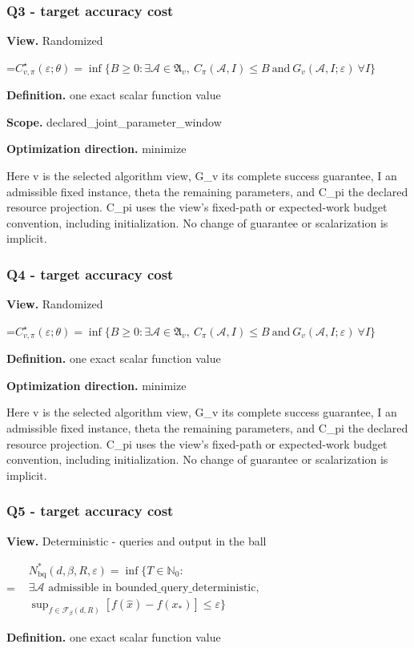 \documentclass[10pt,a4paper]{article}
\newcommand{\AtlasMath}[1]{\par\begingroup\centering\setbox0=\hbox{$\displaystyle #1$}\ifdim\wd0>1.4\linewidth\typeout{ATLAS WIDE FORMULA: \the\wd0}\fi\ifdim\wd0>\linewidth\resizebox{\linewidth}{!}{\box0}\else\box0\fi\par\endgroup}
\begin{document}
\subsubsection{Q3 - target accuracy cost}
\textbf{View.} Randomized

\AtlasMath{C^\star_{v,\pi}(\varepsilon;\theta)=\inf\{B\ge0:\exists\mathcal A\in\mathfrak A_v,\ C_\pi(\mathcal A,I)\le B\ \text{and}\ G_v(\mathcal A,I;\varepsilon)\ \forall I\}}
\textbf{Definition.} one exact scalar function value

\textbf{Scope.} declared\_joint\_parameter\_window

\textbf{Optimization direction.} minimize

Here v is the selected algorithm view, G\_v its complete success guarantee, I an admissible fixed instance, theta the remaining parameters, and C\_pi the declared resource projection. C\_pi uses the view's fixed-path or expected-work budget convention, including initialization. No change of guarantee or scalarization is implicit.

\subsubsection{Q4 - target accuracy cost}
\textbf{View.} Randomized

\AtlasMath{C^\star_{v,\pi}(\varepsilon;\theta)=\inf\{B\ge0:\exists\mathcal A\in\mathfrak A_v,\ C_\pi(\mathcal A,I)\le B\ \text{and}\ G_v(\mathcal A,I;\varepsilon)\ \forall I\}}
\textbf{Definition.} one exact scalar function value

\textbf{Optimization direction.} minimize

Here v is the selected algorithm view, G\_v its complete success guarantee, I an admissible fixed instance, theta the remaining parameters, and C\_pi the declared resource projection. C\_pi uses the view's fixed-path or expected-work budget convention, including initialization. No change of guarantee or scalarization is implicit.

\subsubsection{Q5 - target accuracy cost}
\textbf{View.} Deterministic - queries and output in the ball

\AtlasMath{\begin{aligned}&N_{\mathrm{bq}}^*(d,\beta,R,\varepsilon)=\inf\{T\in\mathbb N_0:\\[3pt]&\exists\mathcal A\text{ admissible in bounded\_query\_deterministic},\\[3pt]&\sup_{f\in\mathcal F_{\beta}(d,R)}[f(\widehat x)-f(x_*)]\le\varepsilon\}\end{aligned}}
\textbf{Definition.} one exact scalar function value
\end{document}
